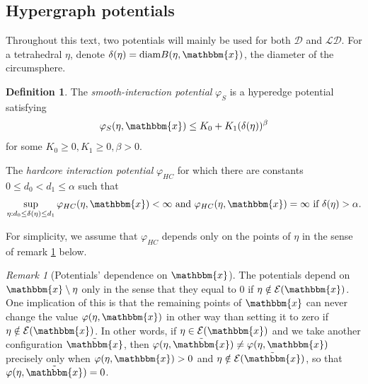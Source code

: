 \documentclass[12pt,a4paper]{article}
\theoremstyle{definition}
\newtheorem{definition}{Definition}
\theoremstyle{remark}
\newtheorem{remark}{Remark}
\theoremstyle{theorem}
\newcommand{\x}{\mathbbm{x}}
\begin{document}
\subsection{Hypergraph potentials}
Throughout this text, two potentials will mainly be used for both $\mathcal D$ and $\mathcal {LD}$. For a tetrahedral $\eta$, denote $\delta(\eta)=\text{diam}B(\eta,\x)$, the diameter of the circumsphere. 


\begin{definition}
	The \textit{smooth-interaction potential} $\varphi_S$ is a hyperedge potential satisfying $$\varphi_S(\eta,\x) \leq K_0 + K_1(\delta(\eta))^\beta$$for some $K_0 \geq 0, K_1 \geq 0, \beta > 0$.

	The \textit{hardcore interaction potential} $\varphi_{HC}$ for which there are constants $0\leq d_0 < d_1 \leq \alpha$  such that
	$$\sup_{\eta: d_0 \leq \delta(\eta) \leq d_1} \varphi_{HC}(\eta,\x) < \infty \text{ and } \varphi_{HC}(\eta,\x)=\infty \text{ if } \delta(\eta)>\alpha.$$ 
\end{definition}
For simplicity, we assume that $\varphi_{HC}$ depends only on the points of $\eta$ in the sense of remark \ref{r:potential} below.


\begin{remark}[Potentials' dependence on $\x$]\label{r:potential}
	The potentials depend on $\x \setminus \eta$ only in the sense that they equal to $0$ if $\eta \notin \mathcal E(\x)$. One implication of this is that the remaining points of $\x$ can never change the value $\varphi(\eta,\x)$ in other way than setting it to zero if $\eta \notin \mathcal E(\x)$. In other words, if $\eta \in \mathcal E(\x)$ and we take another configuration $\tilde{\x}$, then $\varphi(\eta,\tilde{\x}) \neq \varphi(\eta,\x)$ precisely only when $\varphi(\eta,\x) > 0$  and $\eta \notin \mathcal E(\tilde{\x})$, so that $\varphi(\eta,\tilde{\x})=0$.
\end{remark}
\end{document}
